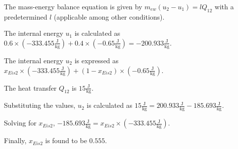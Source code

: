 The mass-energy balance equation is given by \( m_{ew} (u_2 - u_1) = l Q_{12} \) with a predetermined \( l \) (applicable among other conditions). 

The internal energy \( u_1 \) is calculated as \( 0.6 \times (-333.455 \frac{\text{J}}{\text{kg}}) + 0.4 \times (-0.65 \frac{\text{J}}{\text{kg}}) = -200.933 \frac{\text{J}}{\text{kg}} \).

The internal energy \( u_2 \) is expressed as \( x_{Eis2} \times (-333.455 \frac{\text{J}}{\text{kg}}) + (1 - x_{Eis2}) \times (-0.65 \frac{\text{J}}{\text{kg}}) \).

The heat transfer \( Q_{12} \) is \( 15 \frac{\text{J}}{\text{kg}} \).

Substituting the values, \( u_2 \) is calculated as \( 15 \frac{\text{J}}{\text{kg}} = 200.933 \frac{\text{J}}{\text{kg}} - 185.693 \frac{\text{J}}{\text{kg}} \).

Solving for \( x_{Eis2} \), \( -185.693 \frac{\text{J}}{\text{kg}} = x_{Eis2} \times (-333.455 \frac{\text{J}}{\text{kg}}) \).

Finally, \( x_{Eis2} \) is found to be \( 0.555 \).